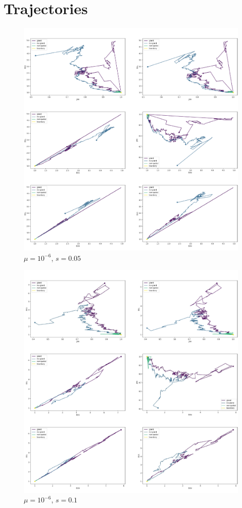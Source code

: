\chapter{Trajectories}\label{app:trajs}

\begin{figure}[h]
\centering
\includegraphics[width=\textwidth]{Chapter_3/figures/1e06005new.pdf}
\caption{$\mu=10^{-6}$, $s=0.05$}
\label{fig:1e06005new}
\end{figure}

\begin{figure}[h]
\centering
\includegraphics[width=\textwidth]{Chapter_3/figures/1e0601new.pdf}
\caption{$\mu=10^{-6}$, $s=0.1$}
\label{fig:1e0601new}
\end{figure}

